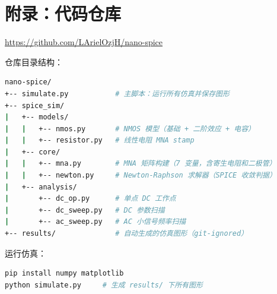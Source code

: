 \documentclass[12pt, a4paper]{article}
\begin{document}
\clearpage
\section*{附录：代码仓库}

\begin{center}
  \url{https://github.com/LArielOzjH/nano-spice}
\end{center}

\medskip
\noindent 仓库目录结构：
\begin{lstlisting}[language=bash, caption={项目目录结构}]
nano-spice/
+-- simulate.py           # 主脚本：运行所有仿真并保存图形
+-- spice_sim/
|   +-- models/
|   |   +-- nmos.py       # NMOS 模型（基础 + 二阶效应 + 电容）
|   |   +-- resistor.py   # 线性电阻 MNA stamp
|   +-- core/
|   |   +-- mna.py        # MNA 矩阵构建（7 变量，含寄生电阻和二极管）
|   |   +-- newton.py     # Newton-Raphson 求解器（SPICE 收敛判据）
|   +-- analysis/
|       +-- dc_op.py      # 单点 DC 工作点
|       +-- dc_sweep.py   # DC 参数扫描
|       +-- ac_sweep.py   # AC 小信号频率扫描
+-- results/              # 自动生成的仿真图形（git-ignored）
\end{lstlisting}

\noindent 运行仿真：
\begin{lstlisting}[language=bash, caption={运行方式}]
pip install numpy matplotlib
python simulate.py     # 生成 results/ 下所有图形
\end{lstlisting}
\end{document}

